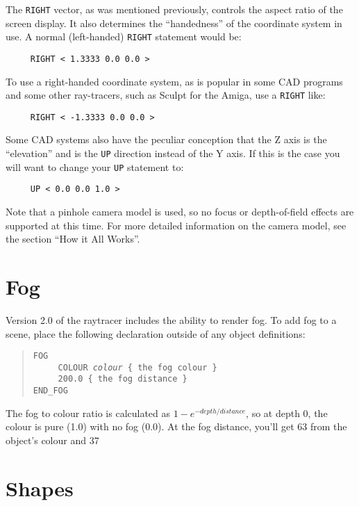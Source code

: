 The {\tt RIGHT} vector, as was mentioned previously, controls the
aspect ratio of the screen display.  It also determines the
``handedness'' of the coordinate system in use.  A normal
(left-handed)%
 {\tt RIGHT} statement would be:
\begin{verbatim}
     RIGHT < 1.3333 0.0 0.0 >
\end{verbatim}
To use a right-handed coordinate system,%
as is popular in some CAD
programs and some other ray-tracers, such as Sculpt for the Amiga, use
a {\tt RIGHT} like:
\begin{verbatim}
     RIGHT < -1.3333 0.0 0.0 >
\end{verbatim}
Some CAD systems also have the peculiar conception that the Z axis is
the ``elevation'' and is the {\tt UP} direction instead of the Y axis.
If this is the case you will want to change your {\tt UP} statement
to:
\begin{verbatim}
     UP < 0.0 0.0 1.0 >
\end{verbatim}
Note that a pinhole camera model%
is used, so no focus or depth-of-field
effects are supported at this time.  For more detailed information on the
camera model, see the section ``How it All Works''.

\section{Fog}

Version 2.0 of the raytracer includes the ability to render fog.  To add fog
to a scene, place the following declaration outside of any object definitions:
\begin{verse}
{\tt FOG} \\
{\tt\ \ \ \ \ COLOUR  {\em colour} \{ the fog colour \}}\\
{\tt\ \ \ \ \ 200.0   \{ the fog distance \}} \\
{\tt END_FOG}
\end{verse}

The fog to colour ratio is calculated as
$1 - e^{-depth / distance}$,
so at depth 0, the colour is pure (1.0)
with no fog (0.0).  At the fog distance, you'll get 63%
from the object's colour and 37%

\section{Shapes}

